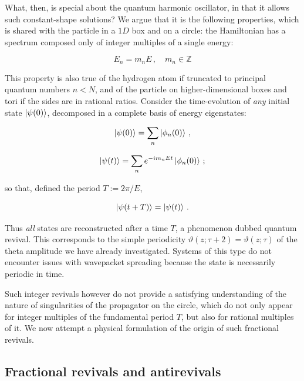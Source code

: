 \documentclass{article}
\newcommand{\T}{\ensuremath{\vartheta}}
\begin{document}
What, then, is special about the quantum harmonic oscillator, in that it allows such constant-shape solutions? We argue that it is the following properties, which is shared with the particle in a $1D$ box and on a circle: the Hamiltonian has a spectrum composed only of integer multiples of a single energy:

\begin{equation}
    E_n = m_n E\,,\quad m_n \in \mathbb{Z}
\end{equation}

This property is also true of the hydrogen atom if truncated to principal quantum numbers $n < N$, and of the particle on higher-dimensional boxes and tori if the sides are in rational ratios. Consider the time-evolution of \emph{any} initial state $\ket{\psi(0)}$, decomposed in a complete basis of energy eigenstates:

\begin{equation}
    \ket{\psi(0)} = \sum_n \ket{\phi_n(0)}\,,
\end{equation}

\begin{equation}
    \ket{\psi(t)} = \sum_n e^{-i m_n E t} \ket{\phi_n(0)}\,;
\end{equation}

so that, defined the period $T := 2\pi / E$,

\begin{equation}
    \ket{\psi(t+T)} = \ket{\psi(t)}\,.
\end{equation}

Thus \emph{all} states are reconstructed after a time $T$, a phenomenon dubbed quantum revival. This corresponds to the simple periodicity $\T(z;\tau+2) = \T(z;\tau)$ of the theta amplitude we have already investigated. Systems of this type do not encounter issues with wavepacket spreading because the state is necessarily periodic in time.

Such integer revivals however do not provide a satisfying understanding of the nature of singularities of the propagator on the circle, which do not only appear for integer multiples of the fundamental period $T$, but also for rational multiples of it. We now attempt a physical formulation of the origin of such fractional revivals.

\subsection{Fractional revivals and antirevivals}
\end{document}
